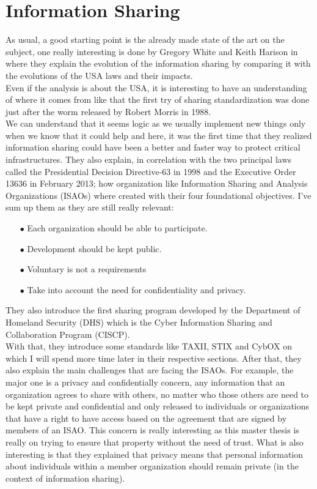\documentclass{eplmastersthesis}
\begin{document}
\section{Information Sharing}
As usual, a good starting point is the already made state of the art on the subject, one really interesting is done by Gregory White and Keith Harison in \cite{white2017state} where they explain the evolution of the information sharing by comparing it with the evolutions of the USA laws and their impacts.\\
Even if the analysis is about the USA, it is interesting to have an understanding of where it comes from like that the first try of sharing standardization was done just after the worm released by Robert Morris in 1988.\\
We can understand that it seems logic as we usually implement new things only when we know that it could help and here, it was the first time that they realized information sharing could have been a better and faster way to protect critical infrastructures. They also explain, in correlation with the two principal laws called the Presidential Decision Directive-63 in 1998 and the Executive Order 13636 in February 2013; how organization like Information Sharing and Analysis Organizations (ISAOs) where created with their four foundational objectives. I've sum up them as they are still really relevant:
\begin{itemize}
\item[$\bullet$] Each organization should be able to participate.
\item[$\bullet$] Development should be kept public.
\item[$\bullet$] Voluntary is not a requirements 
\item[$\bullet$] Take into account the need for confidentiality and privacy.
\end{itemize}
They also introduce the first sharing program developed by the Department of Homeland Security (DHS) which is the Cyber Information Sharing and Collaboration Program (CISCP).\\
With that, they introduce some standards like TAXII, STIX and CybOX on which I will spend more time later in their respective sections. After that, they also explain the main challenges that are facing the ISAOs. For example, the major one is a privacy and confidentially concern, any information that an organization agrees to share with others, no matter who those others are need to be kept private and confidential and only released to individuals or organizations that have a right to have access based on the agreement that are signed by members of an ISAO. This concern is really interesting as this master thesis is really on trying to ensure that property without the need of trust. What is also interesting is that they explained that privacy means that personal information about individuals within a member organization should remain private (in the context of information sharing).
\end{document}
